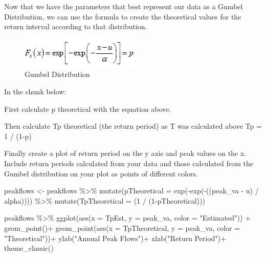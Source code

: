 \documentclass[
]{book}
\newenvironment{Shaded}{\begin{snugshade}}{\end{snugshade}}
\newcommand{\AttributeTok}[1]{\textcolor[rgb]{0.77,0.63,0.00}{#1}}
\newcommand{\DecValTok}[1]{\textcolor[rgb]{0.00,0.00,0.81}{#1}}
\newcommand{\FunctionTok}[1]{\textcolor[rgb]{0.00,0.00,0.00}{#1}}
\newcommand{\NormalTok}[1]{#1}
\newcommand{\OtherTok}[1]{\textcolor[rgb]{0.56,0.35,0.01}{#1}}
\newcommand{\SpecialCharTok}[1]{\textcolor[rgb]{0.00,0.00,0.00}{#1}}
\newcommand{\StringTok}[1]{\textcolor[rgb]{0.31,0.60,0.02}{#1}}
\begin{document}
Now that we have the parameters that best represent our data as a Gumbel Distribution, we can use the formula to create the theoretical values for the return interval according to that distribution.

\begin{figure}
\centering
\includegraphics{images/gumbel.png}
\caption{Gumbel Distribution}
\end{figure}

In the chunk below:

First calculate p theoretical with the equation above.

Then calculate Tp theoretical (the return period) as T was calculated above Tp = 1 / (1-p)

Finally create a plot of return period on the y axis and peak values on the x. Include return periods calculated from your data and those calculated from the Gumbel distribution on your plot as points of different colors.

\begin{Shaded}
\begin{Highlighting}[]
\NormalTok{peakflows }\OtherTok{\textless{}{-}}\NormalTok{ peakflows }\SpecialCharTok{\%\textgreater{}\%} \FunctionTok{mutate}\NormalTok{(}\AttributeTok{pTheoretical =} 
                                    \FunctionTok{exp}\NormalTok{(}\SpecialCharTok{{-}}\FunctionTok{exp}\NormalTok{(}\SpecialCharTok{{-}}\NormalTok{((peak\_va }\SpecialCharTok{{-}}\NormalTok{ u) }\SpecialCharTok{/}\NormalTok{ alpha)))) }\SpecialCharTok{\%\textgreater{}\%}
                           \FunctionTok{mutate}\NormalTok{(}\AttributeTok{TpTheoretical =}\NormalTok{ (}\DecValTok{1} \SpecialCharTok{/}\NormalTok{ (}\DecValTok{1}\SpecialCharTok{{-}}\NormalTok{pTheoretical)))}


\NormalTok{peakflows }\SpecialCharTok{\%\textgreater{}\%} \FunctionTok{ggplot}\NormalTok{(}\FunctionTok{aes}\NormalTok{(}\AttributeTok{x =}\NormalTok{ TpEst, }\AttributeTok{y =}\NormalTok{ peak\_va, }\AttributeTok{color =} \StringTok{"Estimated"}\NormalTok{)) }\SpecialCharTok{+}
  \FunctionTok{geom\_point}\NormalTok{()}\SpecialCharTok{+}
  \FunctionTok{geom\_point}\NormalTok{(}\FunctionTok{aes}\NormalTok{(}\AttributeTok{x =}\NormalTok{ TpTheoretical, }\AttributeTok{y =}\NormalTok{ peak\_va, }\AttributeTok{color =} \StringTok{"Theoretical"}\NormalTok{))}\SpecialCharTok{+}
  \FunctionTok{ylab}\NormalTok{(}\StringTok{"Annual Peak Flows"}\NormalTok{)}\SpecialCharTok{+}
  \FunctionTok{xlab}\NormalTok{(}\StringTok{"Return Period"}\NormalTok{)}\SpecialCharTok{+}
  \FunctionTok{theme\_classic}\NormalTok{() }
\end{Highlighting}
\end{Shaded}
\end{document}
